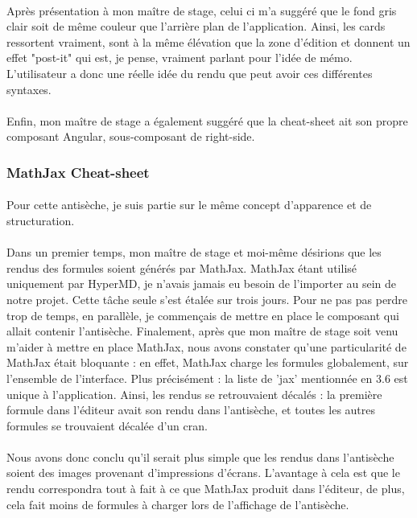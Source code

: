 \documentclass[12pt]{article}
\begin{document}
\paragraph{}
Après présentation à mon maître de stage, celui ci m'a suggéré que le fond gris clair soit de même couleur que l'arrière plan de l'application. Ainsi, les cards ressortent vraiment, sont à la même élévation que la zone d'édition et donnent un effet "post-it" qui est, je pense, vraiment parlant pour l'idée de mémo. L'utilisateur a donc une réelle idée du rendu que peut avoir ces différentes syntaxes.
\paragraph{}
Enfin, mon maître de stage a également suggéré que la cheat-sheet ait son propre composant Angular, sous-composant de right-side.\\

\subsubsection{MathJax Cheat-sheet}
\paragraph{}
Pour cette antisèche, je suis partie sur le même concept d'apparence et de structuration.
\paragraph{}
Dans un premier temps, mon maître de stage et moi-même désirions que les rendus des formules soient générés par MathJax. MathJax étant utilisé uniquement par HyperMD, je n'avais jamais eu besoin de l'importer au sein de notre projet. Cette tâche seule s'est étalée sur trois jours. Pour ne pas pas perdre trop de temps, en parallèle, je commençais de mettre en place le composant qui allait contenir l'antisèche. Finalement, après que mon maître de stage soit venu m'aider à mettre en place MathJax, nous avons constater qu'une particularité de MathJax était bloquante : en effet, MathJax charge les formules globalement, sur l'ensemble de l'interface. Plus précisément : la liste de 'jax' mentionnée en 3.6 est unique à l'application. Ainsi, les rendus se retrouvaient décalés : la première formule dans l'éditeur avait son rendu dans l'antisèche, et toutes les autres formules se trouvaient décalée d'un cran.
\paragraph{}
Nous avons donc conclu qu'il serait plus simple que les rendus dans l'antisèche soient des images provenant d'impressions d'écrans. L'avantage à cela est que le rendu correspondra tout à fait à ce que MathJax produit dans l'éditeur, de plus, cela fait moins de formules à charger lors de l'affichage de l'antisèche.\\
\end{document}

